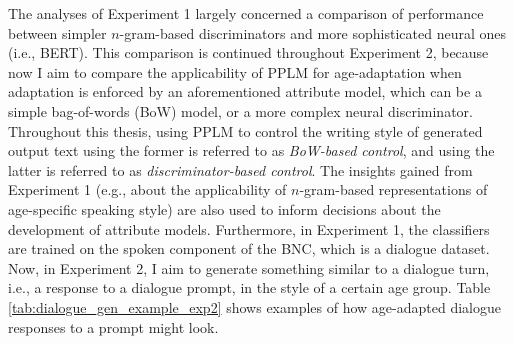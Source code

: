 The analyses of Experiment 1 largely concerned a comparison of performance between simpler $n$-gram-based discriminators and more sophisticated neural ones (i.e., BERT). This comparison is continued throughout Experiment 2, because now I aim to compare the applicability of PPLM for age-adaptation when adaptation is enforced by an aforementioned attribute model, which can be a simple bag-of-words (BoW) model, or a more complex neural discriminator. Throughout this thesis, using PPLM to control the writing style of generated output text using the former is referred to as \textit{BoW-based control}, and using the latter is referred to as \textit{discriminator-based control}. The insights gained from Experiment 1 (e.g., about the applicability of $n$-gram-based representations of age-specific speaking style) are also used to inform decisions about the development of attribute models. Furthermore, in Experiment 1, the classifiers are trained on the spoken component of the BNC, which is a dialogue dataset. Now, in Experiment 2, I aim to generate something similar to a dialogue turn, i.e., a response to a dialogue prompt, in the style of a certain age group. Table \ref{tab:dialogue_gen_example_exp2} shows examples of how age-adapted dialogue responses to a prompt might look.

